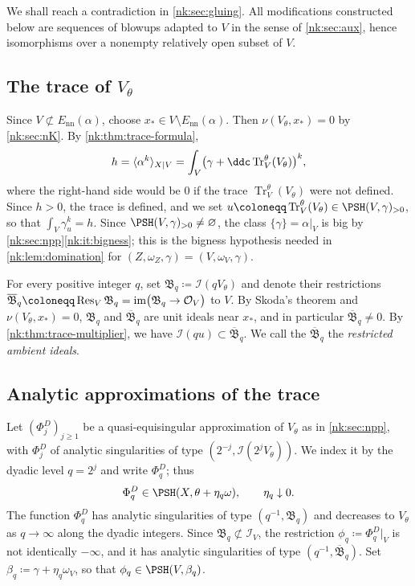 We shall reach a contradiction in \cref{nk:sec:gluing}. All modifications
constructed below are sequences of blowups adapted to $V$ in the sense
of \cref{nk:sec:aux}, hence isomorphisms over a nonempty relatively open
subset of $V$.

\subsection{The trace of \texorpdfstring{$V_\theta$}{V\_theta}}

Since $V\not\subset{E_{\mathrm{nn}}}(\alpha)$, choose
$x_*\in V\setminus{E_{\mathrm{nn}}}(\alpha)$. Then
$\nu(V_\theta,x_*)=0$ by \cref{nk:sec:nK}.
By \cref{nk:thm:trace-formula},
\[
  h=\langle\alpha^k\rangle_{X\mid V}
   =\int_V\bigl(\gamma+\ddc\operatorname{Tr}^\theta_V(V_\theta)\bigr)^k,
\]
where the right-hand side would be $0$ if the trace
$\operatorname{Tr}^\theta_V(V_\theta)$ were not defined. Since $h>0$, the trace is
defined, and we set
$u\coloneqq \operatorname{Tr}^\theta_V(V_\theta)\in\PSH(V,\gamma)_{>0}$, so that
$\int_V\gamma_u^k=h$.
Since $\PSH(V,\gamma)_{>0}\ne\varnothing$, the class
$\{\gamma\}=\alpha|_V$ is big by \cref{nk:sec:npp}\ref{nk:it:bigness}; this
is the bigness hypothesis needed in \cref{nk:lem:domination} for
$(Z,\omega_Z,\gamma)=(V,\omega_V,\gamma)$.

For every positive integer $q$, set
$\mathfrak B_q\coloneqq \mathcal I(qV_\theta)$ and denote their restrictions
$\overline{\mathfrak B}_q\coloneqq \NkRes{V}\mathfrak B_q=\operatorname{im}\bigl(\mathfrak B_q\to\mathcal O_V\bigr)$
to $V$.
By Skoda's theorem and $\nu(V_\theta,x_*)=0$, $\mathfrak B_q$ and
$\overline{\mathfrak B}_q$ are unit ideals near $x_*$, and in particular
$\overline{\mathfrak B}_q\ne0$. By \cref{nk:thm:trace-multiplier}, we have $\mathcal I(qu)\subset\overline{\mathfrak B}_q$.
We call the $\overline{\mathfrak B}_q$ the \emph{restricted ambient ideals}.

\subsection{Analytic approximations of the trace}\label{nk:sec:trace-approx}

Let $(\Phi^D_j)_{j\ge1}$ be a quasi-equisingular approximation of
$V_\theta$ as in \cref{nk:sec:npp}, with $\Phi^D_j$ of analytic
singularities of type $(2^{-j},\mathcal I(2^jV_\theta))$. We index it
by the dyadic level $q=2^j$ and write $\Phi^D_q$; thus
\[
  \Phi^D_q\in\PSH(X,\theta+\eta_q\omega),\qquad
  \eta_q\downarrow0.
\]
The function $\Phi^D_q$ has analytic singularities of type
$(q^{-1},\mathfrak B_q)$ and decreases to $V_\theta$ as $q\to\infty$ along the dyadic
integers. Since $\mathfrak B_q\not\subset\mathcal I_V$, the restriction
$\phi_q\coloneqq \Phi^D_q|_V$ is not identically $-\infty$, and it has analytic
singularities of type $(q^{-1},\overline{\mathfrak B}_q)$.
Set $\beta_q\coloneqq \gamma+\eta_q\omega_V$, so that
$\phi_q\in\PSH(V,\beta_q)$.

